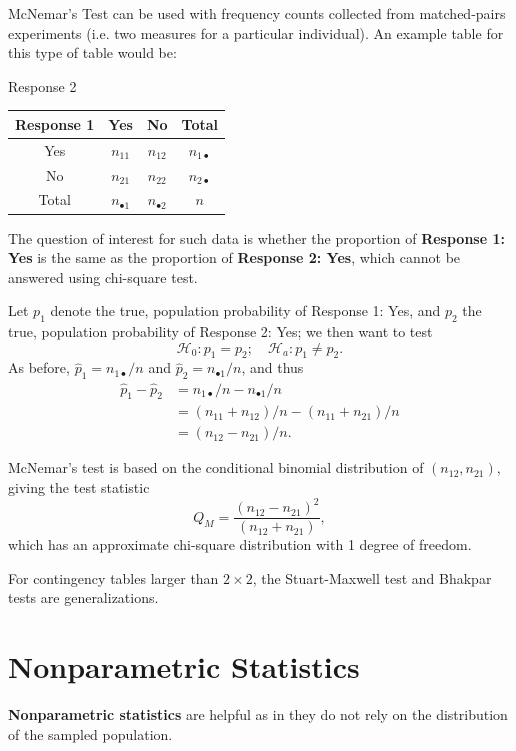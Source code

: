 \documentclass[12pt]{article}
\begin{document}
McNemar's Test can be used with frequency counts collected from matched-pairs experiments (i.e. two measures for a particular individual). An example table for this type of table would be:
\begin{center}
    Response 2\\
    \begin{tabular}{c | c c c}
        Response 1 & Yes & No & Total\\
        \hline
        Yes & $n_{11}$ & $n_{12}$ & $n_{1\bullet}$\\
        No & $n_{21}$ & $n_{22}$ & $n_{2\bullet}$\\
        \hline
        Total & $n_{\bullet 1}$ & $n_{\bullet 2}$ & $n$\\
    \end{tabular}
\end{center}

The question of interest for such data is whether the proportion of \textbf{Response 1: Yes} is the same as the proportion of \textbf{Response 2: Yes}, which cannot be answered using chi-square test.

Let $p_1$ denote the true, population probability of Response 1: Yes, and $p_2$ the true, population probability of Response 2: Yes; we then want to test \[\mathcal{H}_0: p_1 = p_2; \quad \mathcal{H}_a: p_1 \neq p_2.\] As before, $\hat{p}_1 = n_{1\bullet}/n$ and $\hat{p}_2 = n_{\bullet 1}/n$, and thus
\begin{align*}
    \hat{p}_1 - \hat{p}_2 &= n_{1\bullet}/n - n_{\bullet 1}/n\\
    &= (n_{11} + n_{12})/n - (n_{11} + n_{21})/n\\
    &= (n_{12} - n_{21})/n.
\end{align*}

McNemar's test is based on the conditional binomial distribution of $(n_{12}, n_{21})$, giving the test statistic \[Q_M = \frac{(n_{12}-n_{21})^2}{(n_{12} + n_{21})},\] which has an approximate chi-square distribution with 1 degree of freedom. 

For contingency tables larger than $2 \times 2$, the Stuart-Maxwell test and Bhakpar tests are generalizations.

\section{Nonparametric Statistics}

\textbf{Nonparametric statistics} are helpful as in they do not rely on the distribution of the sampled population. 
\end{document}
